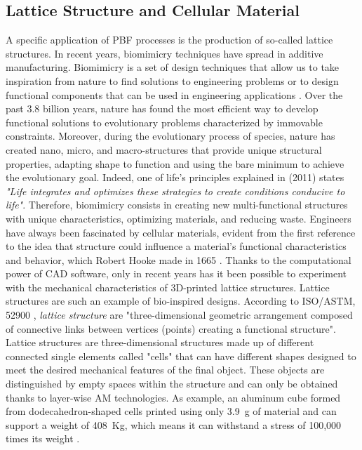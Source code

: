 \subsection{Lattice Structure and Cellular Material} \label{subsec:lattice}
A specific application of PBF processes is the production of so-called lattice structures. In recent years, biomimicry techniques have spread in additive manufacturing. Biomimicry is a set of design techniques that allow us to take inspiration from nature to find solutions to engineering problems or to design functional components that can be used in engineering applications \cite{pathak_biomimicry_2019, du_plessis_beautiful_2019}. Over the past 3.8 billion years, nature has found the most efficient way to develop functional solutions to evolutionary problems characterized by immovable constraints. Moreover, during the evolutionary process of species, nature has created nano, micro, and macro-structures that provide unique structural properties, adapting shape to function and using the bare minimum to achieve the evolutionary goal. Indeed, one of life's principles explained in \citeauthor{baumeister_biomimicry_2011} (2011) states \textit{"Life integrates and optimizes these strategies to create conditions conducive to life"}. Therefore, biomimicry consists in creating new multi-functional structures with unique characteristics, optimizing materials, and reducing waste. Engineers have always been fascinated by cellular materials, evident from the first reference to the idea that structure could influence a material's functional characteristics and behavior, which Robert Hooke made in 1665 \cite{l_gibson_cellular_2010}. Thanks to the computational power of CAD software, only in recent years has it been possible to experiment with the mechanical characteristics of 3D-printed lattice structures. Lattice structures are such an example of bio-inspired designs. According to ISO/ASTM, 52900 \cite{organization_isoastm_2015}, \emph{lattice structure} are "three-dimensional geometric arrangement composed of connective links between vertices (points) creating a functional structure". Lattice structures are three-dimensional structures made up of different connected single elements called "cells" that can have different shapes designed to meet the desired mechanical features of the final object. These objects are distinguished by empty spaces within the structure and can only be obtained thanks to layer-wise AM technologies. 
As example, an aluminum cube formed from dodecahedron-shaped cells printed using only \SI{3.9}{g} of material and can support a weight of \SI{408}{Kg}, which means it can withstand a stress of 100,000 times its weight \cite{noauthor_3d_2014}. 
